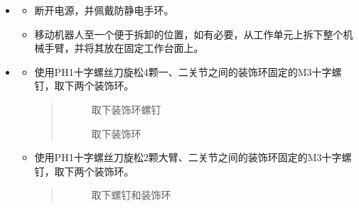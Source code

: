 \documentclass[a4paper,11pt,english,openany,oneside]{sphinxmanual}
\begin{document}
\sphinxAtStartPar
{}
\begin{itemize}
\item {} 
\sphinxAtStartPar
{}
\begin{itemize}
\item {} 
\sphinxAtStartPar
断开电源，并佩戴防静电手环。

\item {} 
\sphinxAtStartPar
移动机器人至一个便于拆卸的位置，如有必要，从工作单元上拆下整个机械手臂，并将其放在固定工作台面上。

\end{itemize}

\item {} 
\sphinxAtStartPar
{}
\begin{itemize}
\item {} 
\sphinxAtStartPar
使用PH1十字螺丝刀旋松4颗一、二关节之间的装饰环固定的M3十字螺钉，取下两个装饰环。
\begin{quote}

\begin{figure}[H]
\centering
\capstart

\noindent{}
\caption{取下装饰环螺钉}\label{\detokenize{_u66f4_u6362_u5173_u8282:id29}}\end{figure}

\begin{figure}[H]
\centering
\capstart

\noindent{}
\caption{取下装饰环}\label{\detokenize{_u66f4_u6362_u5173_u8282:id30}}\end{figure}
\end{quote}

\item {} 
\sphinxAtStartPar
使用PH1十字螺丝刀旋松2颗大臂、二关节之间的装饰环固定的M3十字螺钉，取下两个装饰环。
\begin{quote}

\begin{figure}[H]
\centering
\capstart

\noindent{}
\caption{取下螺钉和装饰环}\label{\detokenize{_u66f4_u6362_u5173_u8282:id31}}\end{figure}
\end{quote}

\end{itemize}


\end{itemize}
\end{document}

